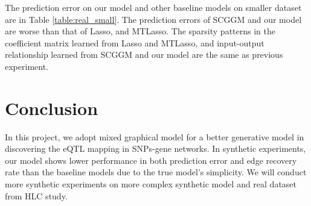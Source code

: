\documentclass{article}
\begin{document}
The prediction error on our model and other baseline models on smaller dataset are in Table \ref{table:real_small}. The prediction errors of SCGGM and our model are worse than that of Lasso, and MTLasso. The sparsity patterns in the coefficient matrix learned from Lasso and MTLasso, and input-output relationship learned from SCGGM and our model are the same as previous experiment. 



\section{Conclusion}
In this project, we adopt mixed graphical model for a better generative model in discovering the eQTL mapping in SNPs-gene networks. In synthetic experiments, our model shows lower performance in both prediction error and edge recovery rate than the baseline models due to the true model's simplicity. We will conduct more synthetic experiments on more complex synthetic model and real dataset from HLC study.



\nocite{*}


\end{document}
